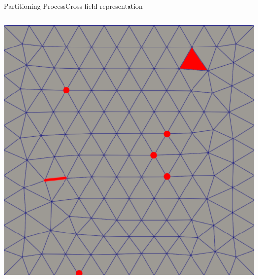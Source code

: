 \documentclass[compress,10pt,aspectratio=169]{beamer}
\begin{document}
\begin{frame}{Partitioning Process}{Cross field representation}
\begin{columns}
\begin{column}{0.2\textwidth}
{    \includegraphics[scale=0.11]{images/zone_singuliere_1.pdf}  \\\vspace{0.2cm}}
\end{column}
\end{columns}
\end{frame}
\end{document}
